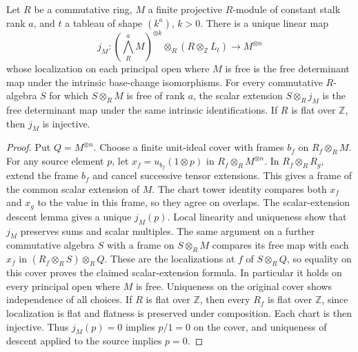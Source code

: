 \begin{lemma}
\label{lem:projective-determinant-inclusion}
\leanok
Let $R$ be a commutative ring, $M$ a finite projective $R$-module
of constant stalk rank $a$, and $t$ a tableau of shape $(k^a)$,
$k>0$. There is a unique linear map
\[
 j_M:(\bigwedge_R^aM)^{\otimes k}\otimes_R(R\otimes_{\mathbb Z}L_t)
 \longrightarrow M^{\otimes n}
\]
whose localization on each principal open where $M$ is free is the
free determinant map under the intrinsic base-change isomorphisms.
For every commutative $R$-algebra $S$ for which $S\otimes_R M$
is free of rank $a$, the scalar extension $S\otimes_R j_M$ is
the free determinant map under the same intrinsic identifications.
If $R$ is flat over $\mathbb Z$, then $j_M$ is injective.
\end{lemma}
\begin{proof}
Put $Q=M^{\otimes n}$. Choose a finite unit-ideal cover with frames
$b_f$ on $R_f\otimes_R M$.
For any source element $p$, let $x_f=u_{b_f}(1\otimes p)$ in
$R_f\otimes_R M^{\otimes n}$. In $R_f\otimes_R R_g$, extend the
frame $b_f$ and cancel successive tensor extensions. This gives a
frame of the common scalar extension of $M$. The chart tower
identity compares both $x_f$ and $x_g$ to the value in this frame,
so they agree on overlaps. The scalar-extension descent lemma
gives a unique $j_M(p)$. Local linearity and uniqueness show that
$j_M$ preserves sums and scalar multiples. The same argument on
a further commutative algebra $S$ with a frame on $S\otimes_R M$
compares its free map with each $x_f$ in $(R_f\otimes_R S)\otimes_R Q$.
These are the localizations at $f$ of $S\otimes_R Q$, so equality
on this cover proves the claimed scalar-extension formula. In
particular it holds on every principal open where $M$ is free.
Uniqueness on the original cover shows independence of all choices. If $R$ is flat over
$\mathbb Z$, then every $R_f$ is flat over $\mathbb Z$, since
localization is flat and flatness is preserved under composition.
Each chart is then injective. Thus $j_M(p)=0$ implies $p/1=0$
on the cover, and uniqueness of descent applied to the source
implies $p=0$.
\end{proof}


